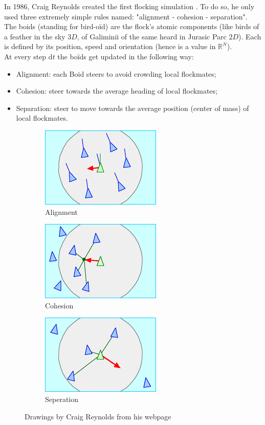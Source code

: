 \documentclass{article}
\begin{document}
In 1986, Craig Reynolds created the first flocking simulation \cite{Rey}. To do so, he only used three extremely simple rules named: "alignment - cohesion - separation". The boids (standing for bird-oïd) are the flock's atomic components (like birds of a feather in the sky $3D$, of Galiminii of the same heard in Jurasic Parc $2D$). Each is defined by its position, speed and orientation (hence is a value in $\mathbb{R}^N$).\\
At every step $\mathrm{d}t$ the boïds get updated in the following way:
\begin{itemize}
    \item Alignment: each Boid steers to avoid crowding local flockmates;
    \item Cohesion: steer towards the average heading of local flockmates;
    \item Separation: steer to move towards the average position (center of mass) of local flockmates.
\end{itemize}
\begin{figure}[h]
    \centering
    \begin{subfigure}[b]{0.3\textwidth}
        \centering
        \includegraphics[scale=1.5]{PJ/Images/alignment.png}
        \caption{Alignment}
        \label{fig:alg}
    \end{subfigure}
    \begin{subfigure}[b]{0.3\textwidth}
        \centering
        \includegraphics[scale=1.5]{PJ/Images/cohesion.png}
        \caption{Cohesion}
        \label{fig:coh}
    \end{subfigure}
    \begin{subfigure}{0.3\textwidth}
        \centering
        \includegraphics[scale=1.5]{PJ/Images/separation.png}
        \caption{Seperation}
        \label{fig:sep}
    \end{subfigure}
    \caption{Drawings by Craig Reynolds from his webpage \cite{Cra}}
    \label{fig: rules}
\end{figure}
\end{document}
